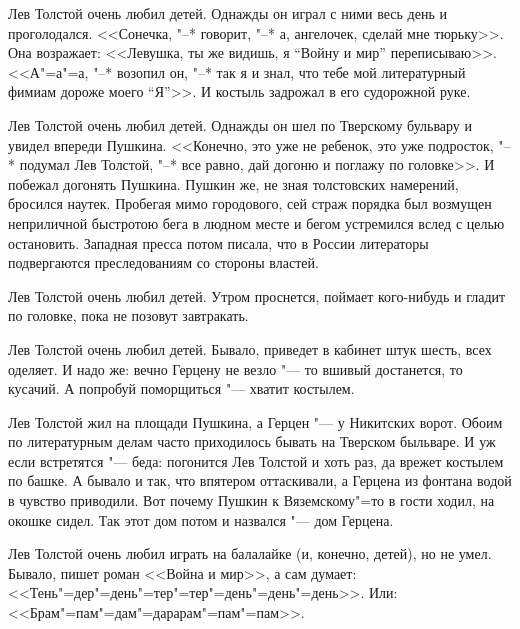 Лев Толстой очень любил детей. Однажды он играл с ними весь день и проголодался.
<<Сонечка, "--* говорит, "--* а, ангелочек, сделай мне тюрьку>>. Она возражает: 
<<Левушка, ты же видишь, я ``Войну и мир'' переписываю>>. <<А"=а"=а, "--* 
возопил он, "--* так я и знал, что тебе мой литературный фимиам дороже моего 
``Я''>>. И костыль задрожал в его судорожной руке.

Лев Толстой очень любил детей. Однажды он шел по Тверскому бульвару и увидел 
впереди Пушкина. <<Конечно, это уже не ребенок, это уже подросток, "--* подумал
Лев Толстой, "--* все равно, дай догоню и поглажу по головке>>. И побежал 
догонять Пушкина. Пушкин же, не зная толстовских намерений, бросился наутек. 
Пробегая мимо городового, сей страж порядка был возмущен неприличной быстротою 
бега в людном месте и бегом устремился вслед с целью остановить. Западная пресса
потом писала, что в России литераторы подвергаются преследованиям со стороны 
властей.

Лев Толстой очень любил детей. Утром проснется, поймает кого-нибудь и гладит по 
головке, пока не позовут завтракать.

Лев Толстой очень любил детей. Бывало, приведет в кабинет штук шесть, всех 
оделяет. И надо же: вечно Герцену не везло "--- то вшивый достанется, то 
кусачий. А попробуй поморщиться "--- хватит костылем.

Лев Толстой жил на площади Пушкина, а Герцен "--- у Никитских ворот. Обоим по 
литературным делам часто приходилось бывать на Тверском быльваре. И уж если 
встретятся "--- беда: погонится Лев Толстой и хоть раз, да врежет костылем по
башке. А бывало и так, что впятером оттаскивали, а Герцена из фонтана водой в
чувство приводили. Вот почему Пушкин к Вяземскому"=то в гости ходил, на окошке  
сидел. Так этот дом потом и назвался "--- дом Герцена.

Лев Толстой очень любил играть на балалайке (и, конечно, детей), но не умел. 
Бывало, пишет роман <<Война и мир>>, а сам думает: 
<<Тень"=дер"=день"=тер"=тер"=день"=день"=день>>. Или: 
<<Брам"=пам"=дам"=дарарам"=пам"=пам>>.
